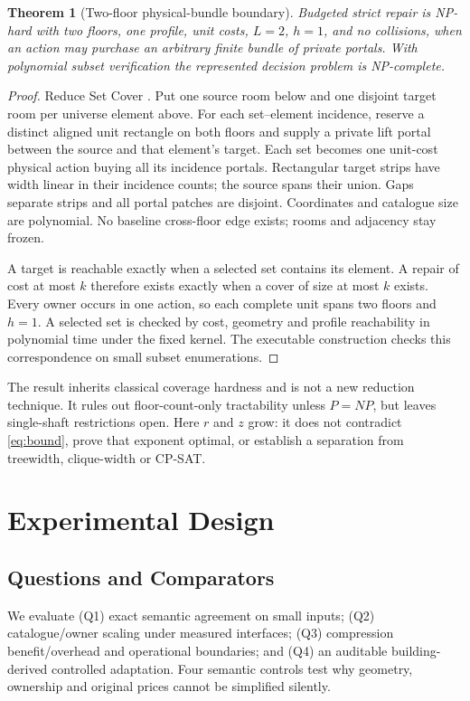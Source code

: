 \documentclass[conference]{IEEEtran}
\newtheorem{theorem}{Theorem}
\begin{document}
\begin{theorem}[Two-floor physical-bundle boundary]\label{thm:hardness}
Budgeted strict repair is NP-hard with two floors, one profile, unit costs, $L=2$, $h=1$, and no collisions, when an action may purchase an arbitrary finite bundle of private portals. With polynomial subset verification the represented decision problem is NP-complete.
\end{theorem}
\begin{proof}
Reduce Set Cover \cite{karp}. Put one source room below and one disjoint target room per universe element above. For each set--element incidence, reserve a distinct aligned unit rectangle on both floors and supply a private lift portal between the source and that element's target. Each set becomes one unit-cost physical action buying all its incidence portals. Rectangular target strips have width linear in their incidence counts; the source spans their union. Gaps separate strips and all portal patches are disjoint. Coordinates and catalogue size are polynomial. No baseline cross-floor edge exists; rooms and adjacency stay frozen.

A target is reachable exactly when a selected set contains its element. A repair of cost at most $k$ therefore exists exactly when a cover of size at most $k$ exists. Every owner occurs in one action, so each complete unit spans two floors and $h=1$. A selected set is checked by cost, geometry and profile reachability in polynomial time under the fixed kernel. The executable construction checks this correspondence on small subset enumerations.
\end{proof}
The result inherits classical coverage hardness and is not a new reduction technique. It rules out floor-count-only tractability unless $P=NP$, but leaves single-shaft restrictions open. Here $r$ and $z$ grow: it does not contradict \eqref{eq:bound}, prove that exponent optimal, or establish a separation from treewidth, clique-width or CP-SAT.

\section{Experimental Design}
\subsection{Questions and Comparators}
We evaluate (Q1) exact semantic agreement on small inputs; (Q2) catalogue/owner scaling under measured interfaces; (Q3) compression benefit/overhead and operational boundaries; and (Q4) an auditable building-derived controlled adaptation. Four semantic controls test why geometry, ownership and original prices cannot be simplified silently.
\end{document}
